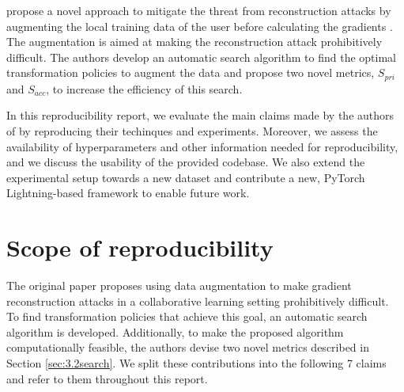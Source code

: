 \citet{gao2021privacy} propose a novel approach to mitigate the threat from reconstruction attacks by augmenting the local training data of the user before calculating the gradients \cite{gao2021privacy}. The augmentation is aimed at making the reconstruction attack prohibitively difficult. The authors develop an automatic search algorithm to find the optimal transformation policies to augment the data and propose two novel metrics, $S_{pri}$ and $S_{acc}$, to increase the efficiency of this search.

In this reproducibility report, we evaluate the main claims made by the authors of \cite{gao2021privacy} by reproducing their techinques and experiments. Moreover, we assess the availability of hyperparameters and other information needed for reproducibility, and we discuss the usability of the provided codebase. We also extend the experimental setup towards a new dataset and contribute a new, PyTorch Lightning-based framework to enable future work.


\section{Scope of reproducibility}
\label{sec:claims}

The original paper \cite{gao2021privacy} proposes using data augmentation to make gradient reconstruction attacks in a collaborative learning setting prohibitively difficult. To find transformation policies that achieve this goal, an automatic search algorithm is developed. Additionally, to make the proposed algorithm computationally feasible, the authors devise two novel metrics described in Section \ref{sec:3.2search}. We split these contributions into the following 7 claims and refer to them throughout this report.

